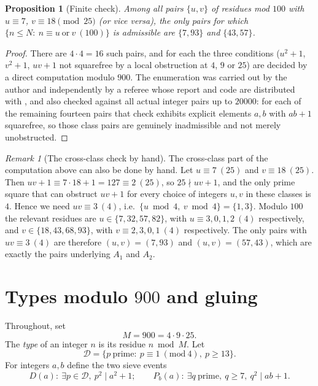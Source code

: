 \documentclass[11pt,a4paper]{article}
\theoremstyle{plain}
\newtheorem{proposition}[theorem]{Proposition}
\theoremstyle{definition}
\theoremstyle{remark}
\newtheorem{remark}[theorem]{Remark}
\newcommand{\Dset}{\mathcal{D}}
\begin{document}
\begin{proposition}[Finite check]\label{prop:only-two}
Among all pairs $\{u,v\}$ of residues mod $100$ with $u\equiv 7$, $v\equiv 18\pmod{25}$ (or vice
versa), the only pairs for which $\{n\le N:\ n\equiv u\ \text{or}\ v\ (100)\}$ is admissible are
$\{7,93\}$ and $\{43,57\}$.
\end{proposition}

\begin{proof}
There are $4\cdot 4=16$ such pairs, and for each the three conditions ($u^2+1$, $v^2+1$, $uv+1$ not
squarefree by a local obstruction at $4$, $9$ or $25$) are decided by a direct computation modulo
$900$. The enumeration was carried out by the author and independently by a referee whose report
and code are distributed with \cite{LeeRepo}, and also checked against all actual integer pairs up
to $20000$: for each of the remaining fourteen pairs that check exhibits explicit elements
$a,b$ with $ab+1$ squarefree, so those class pairs are genuinely inadmissible and not merely
unobstructed.
\end{proof}

\begin{remark}[The cross-class check by hand]\label{rem:hand100}
The cross-class part of the computation above can also be done by hand. Let $u\equiv 7\ (25)$ and
$v\equiv 18\ (25)$. Then $uv+1\equiv 7\cdot 18+1=127\equiv 2\ (25)$, so $25\nmid uv+1$, and the only
prime square that can obstruct $uv+1$ for every choice of integers $u,v$ in these classes is $4$.
Hence we need
$uv\equiv 3\ (4)$, i.e.\ $\{u\bmod 4,\ v\bmod 4\}=\{1,3\}$. Modulo $100$ the relevant residues are
$u\in\{7,32,57,82\}$, with $u\equiv 3,0,1,2\ (4)$ respectively, and $v\in\{18,43,68,93\}$, with
$v\equiv 2,3,0,1\ (4)$ respectively. The only pairs with $uv\equiv 3\ (4)$ are therefore
$(u,v)=(7,93)$ and $(u,v)=(57,43)$, which are exactly the pairs underlying $A_1$ and $A_2$.
\end{remark}

\section{Types modulo $900$ and gluing}\label{sec:types}

Throughout, set
\[
 M=900=4\cdot 9\cdot 25 .
\]
The \emph{type} of an integer $n$ is its residue $n\bmod M$. Let
\[
 \Dset=\{p\ \text{prime}:\ p\equiv 1\ (\mathrm{mod}\ 4),\ p\ge 13\}.
\]
For integers $a,b$ define the two sieve events
\[
 D(a):\ \exists p\in\Dset,\ p^2\mid a^2+1;\qquad
 P_b(a):\ \exists q\ \text{prime},\ q\ge 7,\ q^2\mid ab+1 .
\]
\end{document}
